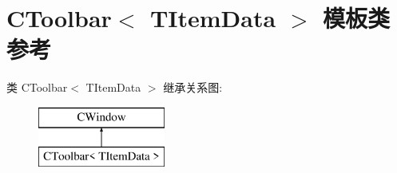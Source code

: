 \hypertarget{class_c_toolbar}{}\section{C\+Toolbar$<$ T\+Item\+Data $>$ 模板类 参考}
\label{class_c_toolbar}
类 C\+Toolbar$<$ T\+Item\+Data $>$ 继承关系图\+:\begin{figure}[H]
\begin{center}
\leavevmode
\includegraphics[height=2.000000cm]{class_c_toolbar}
\end{center}
\end{figure}
